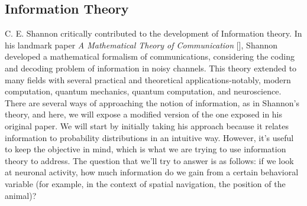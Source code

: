 \subsection{Information Theory}
\label{chap1:sec:3:subsec1:information_theory}
C. E. Shannon critically contributed to the development of Information theory. 
In his landmark paper \textit{A Mathematical Theory of Communication} [\cite{shannon1948}], Shannon developed a mathematical formalism of communications, considering the coding and decoding problem of information in noisy channels.
This theory extended to many fields with several practical and theoretical applications-notably, modern computation, quantum mechanics, quantum computation, and neuroscience.
There are several ways of approaching the notion of information, as in Shannon's theory, and here, we will expose a modified version of the one exposed in his original paper.
We will start by initially taking his approach because it relates information to probability distributions in an intuitive way. 
However, it's useful to keep the objective in mind, which is what we are trying to use information theory to address. 
The question that we'll try to answer is as follows: if we look at neuronal activity, how much information do we gain from a certain behavioral variable (for example, in the context of spatial navigation, the position of the animal)? 


